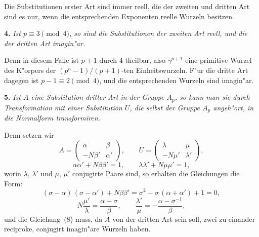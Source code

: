 \documentclass[12pt,a4paper]{article}
\theoremstyle{plain}
\theoremstyle{definition}
\theoremstyle{remark}
\begin{document}
Die Substitutionen erster Art sind immer reell, die der zweiten und dritten Art sind es nur, wenn die entsprechenden Exponenten reelle Wurzeln besitzen.

\medskip\noindent\textbf{4.} \emph{Ist $p \equiv 3 \pmod{4}$, so sind die Substitutionen der zweiten Art reell, und die der dritten Art imagin"ar.}

Denn in diesem Falle ist $p + 1$ durch $4$ theilbar, also $\gamma^{p+1}$ eine primitive Wurzel des K"orpers der $(p^{n}-1)/(p+1)$-ten Einheitswurzeln. F"ur die dritte Art dagegen ist $p - 1 \equiv 2 \pmod{4}$, und die entsprechenden Wurzeln sind imagin"ar.

\medskip\noindent\textbf{5.} \emph{Ist $A$ eine Substitution dritter Art in der Gruppe $A_{p}$, so kann man sie durch Transformation mit einer Substitution $U$, die selbst der Gruppe $A_{p}$ angeh"ort, in die Normalform transformiren.}

Denn setzen wir
\begin{equation}\tag{6}
A = \begin{pmatrix} \alpha & \beta \\ -N\beta' & \alpha' \end{pmatrix},\qquad
U = \begin{pmatrix} \lambda & \mu \\ -N\mu' & \lambda' \end{pmatrix},
\end{equation}
\begin{equation}\tag{7}
\alpha\alpha' + N\beta\beta' = 1,\qquad \lambda\lambda' + N\mu\mu' = 1,
\end{equation}
worin $\lambda$, $\lambda'$ und $\mu$, $\mu'$ conjugirte Paare sind, so erhalten die Gleichungen die Form:
\begin{equation}\tag{8}
(\sigma - \alpha)\,(\sigma - \alpha') + N\beta\beta' = \sigma^{2} - \sigma\,(\alpha + \alpha') + 1 = 0,
\end{equation}
\begin{equation}\tag{9}
N\frac{\mu'}{\lambda} = \frac{\alpha - \sigma}{\beta},\qquad
\frac{\lambda'}{\mu} = -\frac{\alpha - \sigma^{-1}}{\beta},
\end{equation}
und die Gleichung~(8) muss, da $A$ von der dritten Art sein soll, zwei zu einander reciproke, conjugirt imagin"are Wurzeln haben.
\end{document}
